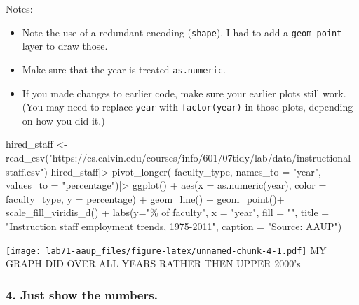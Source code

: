 \documentclass[
]{article}
\newenvironment{Shaded}{\begin{snugshade}}{\end{snugshade}}
\newcommand{\AttributeTok}[1]{\textcolor[rgb]{0.77,0.63,0.00}{#1}}
\newcommand{\FunctionTok}[1]{\textcolor[rgb]{0.00,0.00,0.00}{#1}}
\newcommand{\NormalTok}[1]{#1}
\newcommand{\OtherTok}[1]{\textcolor[rgb]{0.56,0.35,0.01}{#1}}
\newcommand{\SpecialCharTok}[1]{\textcolor[rgb]{0.00,0.00,0.00}{#1}}
\newcommand{\StringTok}[1]{\textcolor[rgb]{0.31,0.60,0.02}{#1}}
\providecommand{\tightlist}{%
  \setlength{\itemsep}{0pt}\setlength{\parskip}{0pt}}
\begin{document}
Notes:

\begin{itemize}
\tightlist
\item
  Note the use of a redundant encoding (\texttt{shape}). I had to add a
  \texttt{geom\_point} layer to draw those.
\item
  Make sure that the year is treated \texttt{as.numeric}.
\item
  If you made changes to earlier code, make sure your earlier plots
  still work. (You may need to replace \texttt{year} with
  \texttt{factor(year)} in those plots, depending on how you did it.)
\end{itemize}

\begin{Shaded}
\begin{Highlighting}[]
\NormalTok{hired\_staff }\OtherTok{\textless{}{-}} \FunctionTok{read\_csv}\NormalTok{(}\StringTok{"https://cs.calvin.edu/courses/info/601/07tidy/lab/data/instructional{-}staff.csv"}\NormalTok{)}
\NormalTok{hired\_staff}\SpecialCharTok{|\textgreater{}}
  \FunctionTok{pivot\_longer}\NormalTok{(}\SpecialCharTok{{-}}\NormalTok{faculty\_type, }\AttributeTok{names\_to =} \StringTok{"year"}\NormalTok{, }\AttributeTok{values\_to =} \StringTok{"percentage"}\NormalTok{)}\SpecialCharTok{|\textgreater{}}
  \FunctionTok{ggplot}\NormalTok{() }\SpecialCharTok{+}
  \FunctionTok{aes}\NormalTok{(}\AttributeTok{x =} \FunctionTok{as.numeric}\NormalTok{(year), }\AttributeTok{color =}\NormalTok{ faculty\_type, }\AttributeTok{y =}\NormalTok{ percentage) }\SpecialCharTok{+}
  \FunctionTok{geom\_line}\NormalTok{() }\SpecialCharTok{+}
  \FunctionTok{geom\_point}\NormalTok{()}\SpecialCharTok{+}
  \FunctionTok{scale\_fill\_viridis\_d}\NormalTok{() }\SpecialCharTok{+}
  \FunctionTok{labs}\NormalTok{(}\AttributeTok{y=}\StringTok{"\% of faculty"}\NormalTok{,}
       \AttributeTok{x =} \StringTok{"year"}\NormalTok{,}
       \AttributeTok{fill =} \StringTok{""}\NormalTok{,}
       \AttributeTok{title =} \StringTok{"Instruction staff employment trends, 1975{-}2011"}\NormalTok{,}
       \AttributeTok{caption =} \StringTok{"Source: AAUP"}\NormalTok{)}
\end{Highlighting}
\end{Shaded}

\texttt{[image: lab71-aaup\_files/figure-latex/unnamed-chunk-4-1.pdf]} MY
GRAPH DID OVER ALL YEARS RATHER THEN UPPER 2000's

\hypertarget{just-show-the-numbers.}{%
\subsubsection{4. Just show the numbers.}\label{just-show-the-numbers.}}
\end{document}
